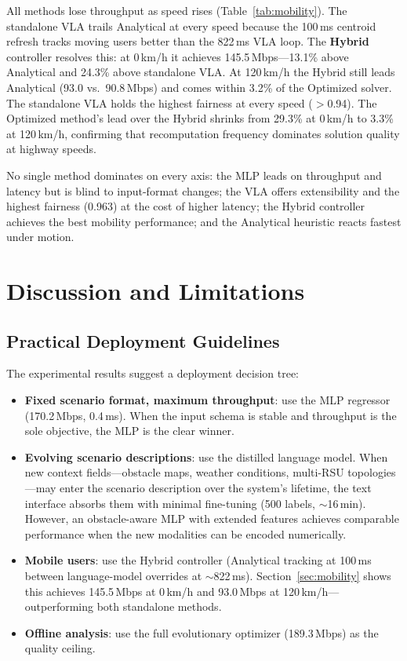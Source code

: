 \documentclass[journal]{IEEEtran}
\begin{document}
All methods lose throughput as speed rises (Table~\ref{tab:mobility}). The standalone VLA trails Analytical at every speed because the 100\,ms centroid refresh tracks moving users better than the 822\,ms VLA loop. The \textbf{Hybrid} controller resolves this: at 0\,km/h it achieves 145.5\,Mbps---13.1\% above Analytical and 24.3\% above standalone VLA. At 120\,km/h the Hybrid still leads Analytical (93.0 vs.\ 90.8\,Mbps) and comes within 3.2\% of the Optimized solver. The standalone VLA holds the highest fairness at every speed ($>$0.94). The Optimized method's lead over the Hybrid shrinks from 29.3\% at 0\,km/h to 3.3\% at 120\,km/h, confirming that recomputation frequency dominates solution quality at highway speeds.


No single method dominates on every axis: the MLP leads on throughput and latency but is blind to input-format changes; the VLA offers extensibility and the highest fairness (0.963) at the cost of higher latency; the Hybrid controller achieves the best mobility performance; and the Analytical heuristic reacts fastest under motion.


\section{Discussion and Limitations}
\label{sec:discussion}

\subsection{Practical Deployment Guidelines}

The experimental results suggest a deployment decision tree:
\begin{itemize}
    \item \textbf{Fixed scenario format, maximum throughput}: use the MLP regressor (170.2\,Mbps, 0.4\,ms). When the input schema is stable and throughput is the sole objective, the MLP is the clear winner.
    \item \textbf{Evolving scenario descriptions}: use the distilled language model. When new context fields---obstacle maps, weather conditions, multi-RSU topologies---may enter the scenario description over the system's lifetime, the text interface absorbs them with minimal fine-tuning (500 labels, ${\sim}$16\,min). However, an obstacle-aware MLP with extended features achieves comparable performance when the new modalities can be encoded numerically.
    \item \textbf{Mobile users}: use the Hybrid controller (Analytical tracking at 100\,ms between language-model overrides at ${\sim}$822\,ms). Section~\ref{sec:mobility} shows this achieves 145.5\,Mbps at 0\,km/h and 93.0\,Mbps at 120\,km/h---outperforming both standalone methods.
    \item \textbf{Offline analysis}: use the full evolutionary optimizer (189.3\,Mbps) as the quality ceiling.
\end{itemize}
\end{document}
